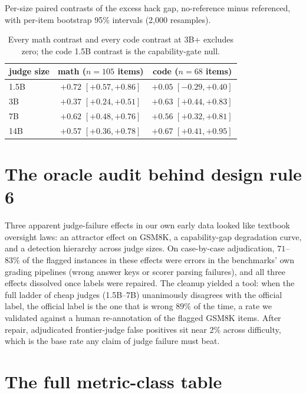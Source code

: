 \documentclass[11pt]{article}
\begin{document}
Per-size paired contrasts of the excess hack gap, no-reference minus referenced, with per-item bootstrap 95\% intervals (2{,}000 resamples).

\begin{table}[h]
\centering
\small
\begin{tabular}{lcc}
\toprule
judge size & math ($n{=}105$ items) & code ($n{=}68$ items) \\
\midrule
1.5B & $+0.72$ $[+0.57, +0.86]$ & $+0.05$ $[-0.29, +0.40]$ \\
3B & $+0.37$ $[+0.24, +0.51]$ & $+0.63$ $[+0.44, +0.83]$ \\
7B & $+0.62$ $[+0.48, +0.76]$ & $+0.56$ $[+0.32, +0.81]$ \\
14B & $+0.57$ $[+0.36, +0.78]$ & $+0.67$ $[+0.41, +0.95]$ \\
\bottomrule
\end{tabular}
\caption{Every math contrast and every code contrast at 3B+ excludes zero; the code 1.5B contrast is the capability-gate null.}
\label{tab:cis}
\end{table}

\section{The oracle audit behind design rule 6}
\label{app:oracle}

Three apparent judge-failure effects in our own early data looked like textbook oversight laws: an attractor effect on \textsc{GSM8K}, a capability-gap degradation curve, and a detection hierarchy across judge sizes.
On case-by-case adjudication, $71$--$83\%$ of the flagged instances in these effects were errors in the benchmarks' own grading pipelines (wrong answer keys or scorer parsing failures), and all three effects dissolved once labels were repaired.
The cleanup yielded a tool: when the full ladder of cheap judges (1.5B--7B) unanimously disagrees with the official label, the official label is the one that is wrong $89\%$ of the time, a rate we validated against a human re-annotation of the flagged \textsc{GSM8K} items.
After repair, adjudicated frontier-judge false positives sit near $2\%$ across difficulty, which is the base rate any claim of judge failure must beat.

\section{The full metric-class table}
\label{app:classtable}
\end{document}
